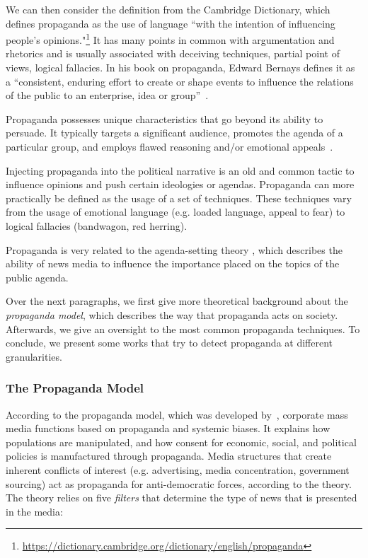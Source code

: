 
We can then consider the definition from the Cambridge Dictionary, which defines propaganda as the use of language ``with the intention of influencing people's opinions."\footnote{\url{https://dictionary.cambridge.org/dictionary/english/propaganda}}
It has many points in common with argumentation and rhetorics and is usually associated with deceiving techniques, partial point of views, logical fallacies.
In his book on propaganda, Edward Bernays defines it as a ``consistent, enduring effort to create or shape events to influence the relations of the public to an enterprise, idea or group''~\cite{bernays}.

Propaganda possesses unique characteristics that go beyond its ability to persuade. It typically targets a significant audience, promotes the agenda of a particular group, and employs flawed reasoning and/or emotional appeals~\cite{miller1939techniques}.

Injecting propaganda into the political narrative is an old and common tactic to influence opinions and push certain ideologies or agendas.
Propaganda can more practically be defined as the usage of a set of techniques. These techniques vary from the usage of emotional language (e.g. loaded language, appeal to fear) to logical fallacies (bandwagon, red herring).

Propaganda is very related to the agenda-setting theory \citep{Cohen_1964,mccombs1972agenda}, which describes the ability of news media to influence the importance placed on the topics of the public agenda.

Over the next paragraphs, we first give more theoretical background about the \emph{propaganda model}, which describes the way that propaganda acts on society.
Afterwards, we give an oversight to the most common propaganda techniques.
To conclude, we present some works that try to detect propaganda at different granularities.

\subsubsection{The Propaganda Model}

According to the propaganda model, which was developed by~\citet{herman1988manufacturing}, corporate mass media functions based on propaganda and systemic biases. It explains how populations are manipulated, and how consent for economic, social, and political policies is manufactured through propaganda. Media structures that create inherent conflicts of interest (e.g. advertising, media concentration, government sourcing) act as propaganda for anti-democratic forces, according to the theory.
The theory relies on five \emph{filters} that determine the type of news that is presented in the media:

